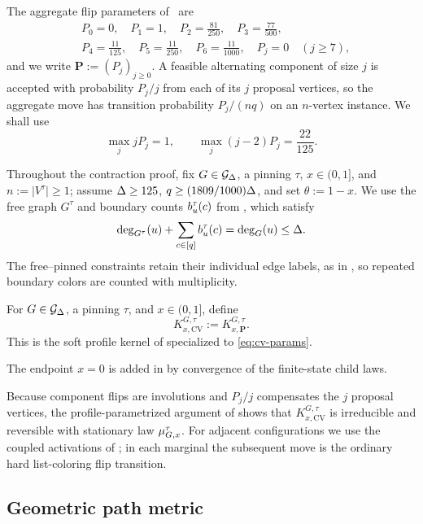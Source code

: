 The aggregate flip parameters of~\cite[Eq.~(1)]{CarlsonVigoda2024} are
\begin{equation}\label{eq:cv-params}
\begin{aligned}
  &P_0=0,\quad P_1=1,\quad P_2=\frac{81}{250},\quad
    P_3=\frac{77}{500},\\
  &P_4=\frac{11}{125},\quad P_5=\frac{11}{250},\quad
    P_6=\frac{11}{1000},\quad P_j=0\quad(j\ge7),
\end{aligned}
\end{equation}
and we write \(\boldsymbol P:=(P_j)_{j\ge0}\).  A feasible alternating
component of size \(j\) is accepted with probability \(P_j/j\) from each
of its \(j\) proposal vertices, so the aggregate move has transition
probability \(P_j/(nq)\) on an \(n\)-vertex instance.  We shall use
\[
  \max_j jP_j=1,
  \qquad
  \max_j(j-2)P_j=\frac{22}{125}.
\]

Throughout the contraction proof, fix \(G\in\mathcal{G}_{\Delta}\), a pinning
\(\tau\), \(x\in(0,1]\), and \(n:=\lvert V^\tau\rvert\ge1\); assume
\(\Delta\ge125\), \(q\ge(1809/1000)\Delta\), and set \(\theta:=1-x\).
We use the free graph \(G^\tau\) and boundary counts \(b_u^\tau(c)\)
from , which satisfy
\[
  \deg_{G^\tau}(u)+\sum_{c\in[q]}b_u^\tau(c)
  =\deg_G(u)\le\Delta.
\]
The free--pinned constraints retain their individual edge labels, as in
, so repeated boundary colors are counted
with multiplicity.

\begin{definition}\label{def:cv-kernel}
For \(G\in\mathcal{G}_{\Delta}\), a pinning \(\tau\), and \(x\in(0,1]\), define
\[
  K_{x,\mathrm{CV}}^{G,\tau}:=K_{x,\boldsymbol P}^{G,\tau}.
\]
This is the soft profile kernel of 
specialized to \eqref{eq:cv-params}.
\end{definition}

The endpoint $x=0$ is added in  by convergence of the
finite-state child laws.

Because component flips are involutions and $P_j/j$ compensates the $j$
proposal vertices, the profile-parametrized argument of
 shows that \(K_{x,\mathrm{CV}}^{G,\tau}\) is irreducible and
reversible with stationary law $\mu_{G,x}^{\tau}$.  For adjacent
configurations we use the coupled activations of
; in each marginal the subsequent
move is the ordinary hard list-coloring flip transition.

\subsection{Geometric path metric}

